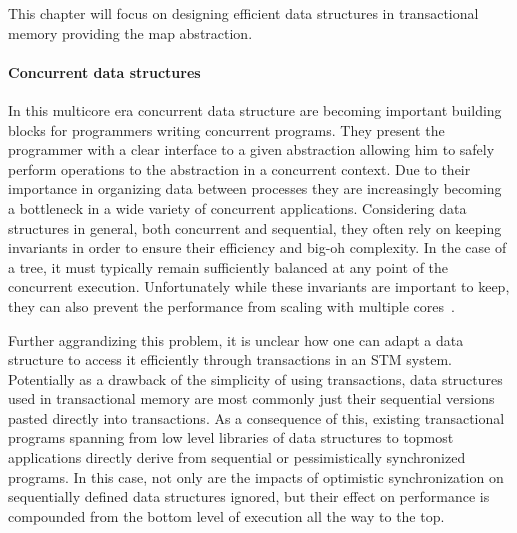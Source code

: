 This chapter will focus on designing efficient data structures in transactional memory providing the map abstraction.


\paragraph{Concurrent data structures}
In this multicore era concurrent data structure are becoming important building blocks
for programmers writing concurrent programs.
They present the programmer with a clear interface to a given abstraction allowing
him to safely perform operations to the abstraction in a concurrent context.
Due to their importance in organizing data between processes they are increasingly becoming a bottleneck
in a wide variety of concurrent applications.
Considering data structures in general, both concurrent and sequential, they often rely on keeping invariants
in order to ensure their efficiency and big-oh complexity.
In the case of a tree, it must typically remain sufficiently balanced at any point of the concurrent execution.
Unfortunately while these invariants are important to keep, they can also prevent
the performance from scaling with multiple cores~\cite{Sha2011}.


Further aggrandizing this problem, it is unclear how one can adapt a data structure to 
access it efficiently through transactions in an STM system.
Potentially as a drawback of the simplicity of using transactions, 
data structures used in transactional memory are most commonly just
their sequential versions pasted directly into transactions.
As a consequence of this, existing transactional programs spanning from low level libraries of data structures to 
topmost applications directly derive from sequential or pessimistically synchronized programs.
In this case, not only are the impacts of optimistic synchronization on sequentially defined data structures
ignored, but their effect on performance is compounded from the bottom level of execution all the way to the top.

